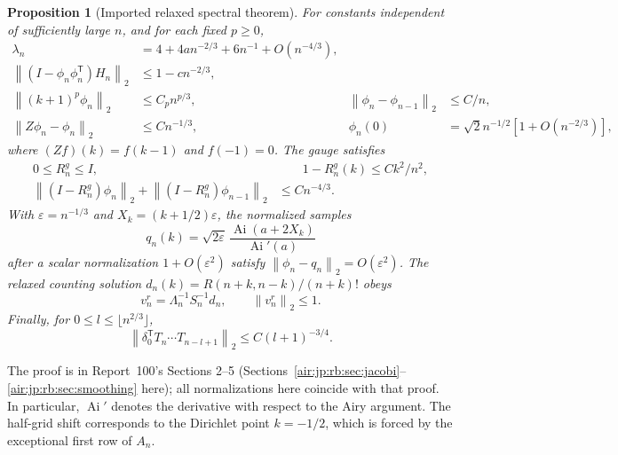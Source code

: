 \documentclass[11pt,letterpaper]{article}
\numberwithin{equation}{section}
\newtheorem{proposition}[theorem]{Proposition}
\theoremstyle{remark}
\newcommand{\Ai}{\operatorname{Ai}}
\newcommand{\eps}{\varepsilon}
\newcommand{\normtwo}[1]{\left\lVert#1\right\rVert_2}
\begin{document}
\begin{proposition}[Imported relaxed spectral theorem]\label{air:jp:dfa:prop:input}
For constants independent of sufficiently large $n$, and for each fixed $p\ge0$,
\begin{align}
 \lambda_n&=4+4an^{-2/3}+6n^{-1}+O(n^{-4/3}),\label{air:jp:dfa:eq:lambda}\\
 \normtwo{(I-\phi_n\phi_n^{\mathsf T})H_n}&\le1-cn^{-2/3},\label{air:jp:dfa:eq:gap}\\
 \normtwo{(k+1)^p\phi_n}&\le C_pn^{p/3},&
 \normtwo{\phi_n-\phi_{n-1}}&\le C/n,\label{air:jp:dfa:eq:drift}\\
 \normtwo{Z\phi_n-\phi_n}&\le Cn^{-1/3},&
 \phi_n(0)&=\sqrt2 n^{-1/2}[1+O(n^{-2/3})],\label{air:jp:dfa:eq:endphi}
\end{align}
where $(Zf)(k)=f(k-1)$ and $f(-1)=0$. The gauge satisfies
\begin{align}
 0\le R_n^g\le I,&\qquad 1-R_n^g(k)\le Ck^2/n^2,\label{air:jp:dfa:eq:gaugebound}\\
 \normtwo{(I-R_n^g)\phi_n}+\normtwo{(I-R_n^g)\phi_{n-1}}&\le Cn^{-4/3}.\label{air:jp:dfa:eq:gaugevector}
\end{align}
With $\eps=n^{-1/3}$ and $X_k=(k+1/2)\eps$, the normalized samples
\[
 q_n(k)=\sqrt{2\eps}\,\frac{\Ai(a+2X_k)}{\Ai'(a)}
\]
after a scalar normalization $1+O(\eps^2)$ satisfy $\normtwo{\phi_n-q_n}=O(\eps^2)$.
The relaxed counting solution $d_n(k)=R(n+k,n-k)/(n+k)!$ obeys
\begin{equation}\label{air:jp:dfa:eq:relaxednorm}
 v_n^r=\Lambda_n^{-1}S_n^{-1}d_n,\qquad \normtwo{v_n^r}\le1.
\end{equation}
Finally, for $0\le l\le\lfloor n^{2/3}\rfloor$,
\begin{equation}\label{air:jp:dfa:eq:smoothing}
 \normtwo{\delta_0^{\mathsf T}T_n\cdots T_{n-l+1}}
 \le C(l+1)^{-3/4}.
\end{equation}
\end{proposition}
The proof is in Report~100's Sections 2--5 (Sections~\ref{air:jp:rb:sec:jacobi}--\ref{air:jp:rb:sec:smoothing} here); all normalizations here coincide with that proof. In particular, $\Ai'$ denotes the derivative with respect to the Airy argument. The half-grid shift corresponds to the Dirichlet point $k=-1/2$, which is forced by the exceptional first row of $A_n$.
\end{document}

